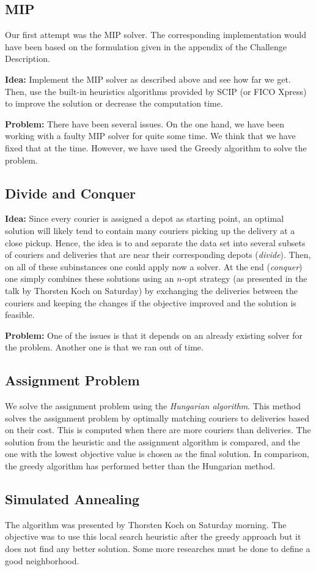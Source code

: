 \documentclass[a4paper]{article}
\begin{document}
\subsection{MIP}
Our first attempt was the MIP solver.
The corresponding implementation would have been based on the formulation given in the appendix of the Challenge Description.

\noindent\textbf{Idea:}
Implement the MIP solver as described above and see how far we get.
Then, use the built-in heuristics algorithms provided by SCIP (or FICO Xpress) to improve the solution or decrease the computation time.

\noindent\textbf{Problem:}
There have been several issues.
On the one hand, we have been working with a faulty MIP solver for quite some time.
We think that we have fixed that at the time.
However, we have used the Greedy algorithm to solve the problem.


\subsection{Divide and Conquer}
\textbf{Idea:}
Since every courier is assigned a depot as starting point, an optimal solution will likely tend to contain many couriers picking up the delivery at a close pickup.
Hence, the idea is to and separate the data set into several subsets of couriers and deliveries that are near their corresponding depots (\emph{divide}).
Then, on all of these subinstances one could apply now a solver.
At the end (\emph{conquer}) one simply combines these solutions using an $n$-opt strategy (as presented in the talk by Thorsten Koch on Saturday) by exchanging the deliveries between the couriers and keeping the changes if the objective improved and the solution is feasible.

\noindent\textbf{Problem:} One of the issues is that it depends on an already existing solver for the problem.
Another one is that we ran out of time.

\subsection{Assignment Problem}
We solve the assignment problem using the \emph{Hungarian algorithm}.
This method solves the assignment problem by optimally matching couriers to deliveries based on their cost.
This is computed when there are more couriers than deliveries. The solution from the heuristic and the assignment algorithm is compared, and the one with the lowest objective value is chosen as the final solution.
In comparison, the greedy algorithm has performed better than the Hungarian method.

\subsection{Simulated Annealing}
The algorithm was presented by Thorsten Koch on Saturday morning. The objective was to use this local search heuristic after the greedy approach but it does not find any better solution. Some more researches must be done to define a good neighborhood.
\end{document}
